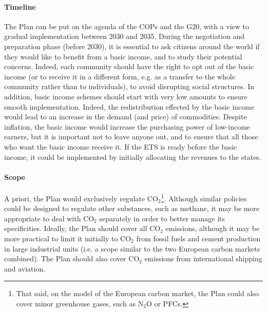 \documentclass[a5paper,english,openany]{memoir}
\begin{document}
\paragraph{Timeline} 
The Plan can be put on the agenda of the COPs and the G20, with a view to gradual implementation between 2030 and 2035. During the negotiation and preparation phase (before 2030), it is essential to ask citizens around the world if they would like to benefit from a basic income, and to study their potential concerns. Indeed, each community should have the right to opt out of the basic income (or to receive it in a different form, e.g. as a transfer to the whole community rather than to individuals), to avoid disrupting social structures. In addition, basic income schemes should start with very low amounts to ensure smooth implementation. Indeed, the redistribution effected by the basic income would lead to an increase in the demand (and price) %
of commodities. Despite inflation, the basic income would increase the purchasing power of low-income earners, but it is important not to leave anyone out, and to ensure that all those who want the basic income receive it. If the ETS is ready before the basic income, it could be implemented by initially %
allocating the revenues to the states.

\paragraph{Scope} 
A priori, the Plan would exclusively regulate CO$_\text{2}$\footnote{That said, on the model of the European carbon market, the Plan could also cover minor greenhouse gases, such as N$_\text{2}$O or PFCs.}. Although similar policies could be designed to regulate other substances, such as methane, it may be more appropriate to deal with CO$_\text{2}$ separately in order to better manage its specificities. Ideally, the Plan should cover all CO$_\text{2}$ emissions, although it may be more practical to limit it initially to CO$_\text{2}$ from fossil fuels and cement production in large industrial units (i.e. a scope similar to the two European carbon markets combined). The Plan should also cover CO$_\text{2}$ emissions from international shipping and aviation. 
\end{document}
